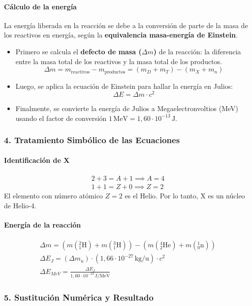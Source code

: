 \paragraph{Cálculo de la energía}
La energía liberada en la reacción se debe a la conversión de parte de la masa de los reactivos en energía, según la \textbf{equivalencia masa-energía de Einstein}.
\begin{itemize}
    \item Primero se calcula el \textbf{defecto de masa ($\Delta m$)} de la reacción: la diferencia entre la masa total de los reactivos y la masa total de los productos.
    $$\Delta m = m_{\text{reactivos}} - m_{\text{productos}} = (m_D + m_T) - (m_X + m_n)$$
    \item Luego, se aplica la ecuación de Einstein para hallar la energía en Julios:
    $$\Delta E = \Delta m \cdot c^2$$
    \item Finalmente, se convierte la energía de Julios a Megaelectronvoltios (MeV) usando el factor de conversión $1 \, \text{MeV} = 1,60 \cdot 10^{-13} \, \text{J}$.
\end{itemize}

\subsubsection*{4. Tratamiento Simbólico de las Ecuaciones}
\paragraph{Identificación de X}
\begin{gather}
    2 + 3 = A + 1 \implies A = 4 \\
    1 + 1 = Z + 0 \implies Z = 2
\end{gather}
El elemento con número atómico $Z=2$ es el Helio. Por lo tanto, X es un núcleo de Helio-4.
\paragraph{Energía de la reacción}
\begin{gather}
    \Delta m = (m({}_1^2\text{H}) + m({}_1^3\text{H})) - (m({}_2^4\text{He}) + m({}_0^1\text{n})) \\
    \Delta E_J = (\Delta m_u) \cdot (1,66 \cdot 10^{-27} \, \text{kg/u}) \cdot c^2 \\
    \Delta E_{MeV} = \frac{\Delta E_J}{1,60 \cdot 10^{-13} \, \text{J/MeV}}
\end{gather}

\subsubsection*{5. Sustitución Numérica y Resultado}
